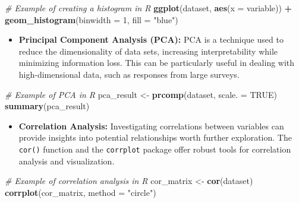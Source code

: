\documentclass[
]{book}
\newenvironment{Shaded}{\begin{snugshade}}{\end{snugshade}}
\newcommand{\AttributeTok}[1]{\textcolor[rgb]{0.13,0.29,0.53}{#1}}
\newcommand{\CommentTok}[1]{\textcolor[rgb]{0.56,0.35,0.01}{\textit{#1}}}
\newcommand{\ConstantTok}[1]{\textcolor[rgb]{0.56,0.35,0.01}{#1}}
\newcommand{\DecValTok}[1]{\textcolor[rgb]{0.00,0.00,0.81}{#1}}
\newcommand{\FunctionTok}[1]{\textcolor[rgb]{0.13,0.29,0.53}{\textbf{#1}}}
\newcommand{\NormalTok}[1]{#1}
\newcommand{\OtherTok}[1]{\textcolor[rgb]{0.56,0.35,0.01}{#1}}
\newcommand{\SpecialCharTok}[1]{\textcolor[rgb]{0.81,0.36,0.00}{\textbf{#1}}}
\newcommand{\StringTok}[1]{\textcolor[rgb]{0.31,0.60,0.02}{#1}}
\providecommand{\tightlist}{%
  \setlength{\itemsep}{0pt}\setlength{\parskip}{0pt}}
\begin{document}
\begin{Shaded}
\begin{Highlighting}[]
\CommentTok{\# Example of creating a histogram in R}
\FunctionTok{ggplot}\NormalTok{(dataset, }\FunctionTok{aes}\NormalTok{(}\AttributeTok{x =}\NormalTok{ variable)) }\SpecialCharTok{+} \FunctionTok{geom\_histogram}\NormalTok{(}\AttributeTok{binwidth =} \DecValTok{1}\NormalTok{, }\AttributeTok{fill =} \StringTok{"blue"}\NormalTok{)}
\end{Highlighting}
\end{Shaded}

\begin{itemize}
\tightlist
\item
  \textbf{Principal Component Analysis (PCA):} PCA is a technique used to reduce the dimensionality of data sets, increasing interpretability while minimizing information loss. This can be particularly useful in dealing with high-dimensional data, such as responses from large surveys.
\end{itemize}

\begin{Shaded}
\begin{Highlighting}[]
\CommentTok{\# Example of PCA in R}
\NormalTok{pca\_result }\OtherTok{\textless{}{-}} \FunctionTok{prcomp}\NormalTok{(dataset, }\AttributeTok{scale. =} \ConstantTok{TRUE}\NormalTok{)}
\FunctionTok{summary}\NormalTok{(pca\_result)}
\end{Highlighting}
\end{Shaded}

\begin{itemize}
\tightlist
\item
  \textbf{Correlation Analysis:} Investigating correlations between variables can provide insights into potential relationships worth further exploration. The \texttt{cor()} function and the \texttt{corrplot} package offer robust tools for correlation analysis and visualization.
\end{itemize}

\begin{Shaded}
\begin{Highlighting}[]
\CommentTok{\# Example of correlation analysis in R}
\NormalTok{cor\_matrix }\OtherTok{\textless{}{-}} \FunctionTok{cor}\NormalTok{(dataset)}
\FunctionTok{corrplot}\NormalTok{(cor\_matrix, }\AttributeTok{method =} \StringTok{"circle"}\NormalTok{)}
\end{Highlighting}
\end{Shaded}
\end{document}
